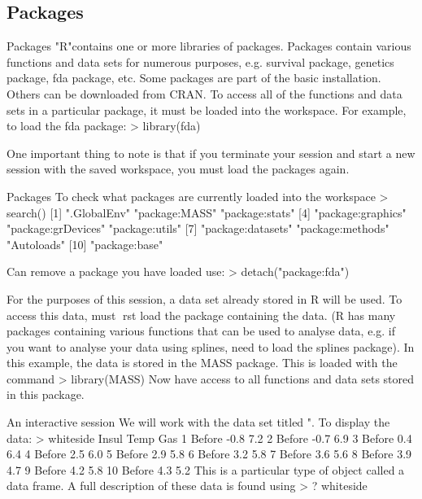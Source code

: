 
\subsection*{Packages}
\begin{frame}

Packages
"R"contains one or more libraries of packages. Packages contain
various functions and data sets for numerous purposes, e.g.
survival package, genetics package, fda package, etc.
Some packages are part of the basic installation. Others can be
downloaded from CRAN.
To access all of the functions and data sets in a particular package,
it must be loaded into the workspace. For example, to load the
fda package:
> library(fda)

One important thing to note is that if you terminate your session
and start a new session with the saved workspace, you must load
the packages again.

\begin{frame}
Packages
To check what packages are currently loaded into the workspace
> search()
[1] ".GlobalEnv" "package:MASS" "package:stats"
[4] "package:graphics" "package:grDevices" "package:utils"
[7] "package:datasets" "package:methods" "Autoloads"
[10] "package:base"

Can remove a package you have loaded use:
> detach("package:fda")

\begin{frame}

For the purposes of this session, a data set already stored in R will
be used. To access this data, must rst load the package
containing the data. (R has many packages containing various
functions that can be used to analyse data, e.g. if you want to
analyse your data using splines, need to load the splines
package). In this example, the data is stored in the MASS package.
This is loaded with the command
> library(MASS)
Now have access to all functions and data sets stored in this
package.


\begin{frame}
An interactive session
We will work with the data set titled \whiteside". To display the
data:
> whiteside
Insul Temp Gas
1 Before -0.8 7.2
2 Before -0.7 6.9
3 Before 0.4 6.4
4 Before 2.5 6.0
5 Before 2.9 5.8
6 Before 3.2 5.8
7 Before 3.6 5.6
8 Before 3.9 4.7
9 Before 4.2 5.8
10 Before 4.3 5.2
This is a particular type of object called a data frame.
A full description of these data is found using
> ? whiteside


\end{frame}
\end{frame}
\end{frame}
\end{frame}
